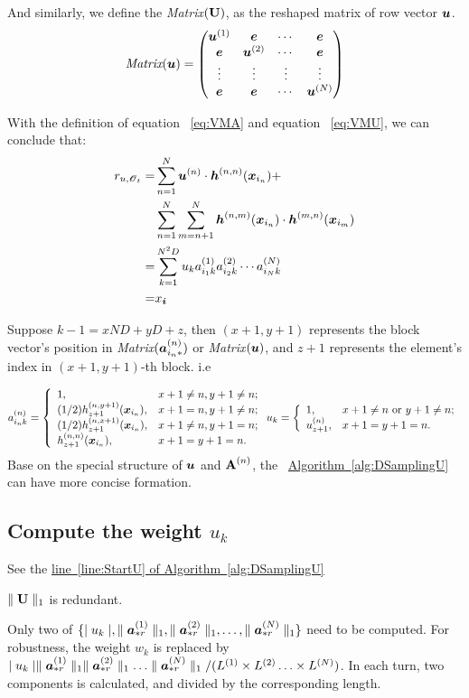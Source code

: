 \documentclass{article}
\newcommand{\Sca}[3]{{#1}^{(#2)}_{i_#2#3}}%
\newcommand{\T}[1]{\boldsymbol{\mathscr{\MakeUppercase{#1}}}}%
\newcommand{\V}[1]{{\bm{{\MakeLowercase{#1}}}}}%
\newcommand{\Varow}[1]{\V{a}^{(#1)}_{i_#1*}}
\newcommand{\Vacol}[1]{\V{a}^{(#1)}_{*r}}
\newcommand{\Vh}[2]{\V{h}^{(#1,#2)}{(\V{x}_{i_#1}})}
\newcommand{\M}[1]{{\bm{\mathbf{\MakeUppercase{#1}}}}}%
\newcommand{\norm}[2]{\parallel#1\parallel_{#2}}
\newcommand{\Alg}[1]{\hyperref[alg:#1]{Algorithm~\ref*{alg:#1}}}
\newcommand{\AlgLine}[2]{\hyperref[alg:#1]{line~\ref*{line:#2} of Algorithm~\ref*{alg:#1}}}
\begin{document}
And similarly, we define the \emph{Matrix}$(\M{U})$, as the reshaped matrix of row vector $\V{U}$.
\begin{equation}
\label{eq:VMU}
\emph{Matrix}(\V{U})=
\begin{pmatrix}
\V{u}^{(1)} & \V{e}       & \cdots & \V{e} \cr
\V{e}       & \V{u}^{(2)} & \cdots & \V{e}\cr
\vdots      & \vdots      & \vdots & \vdots\cr
\V{e}       & \V{e}       & \cdots & \V{u}^{(N)}\cr
\end{pmatrix}
\end{equation}

With the definition of equation ~\ref{eq:VMA} and equation ~\ref{eq:VMU}, we can conclude that:
\begin{align*}
r_{u,\T{O}_t} =
&\sum_{n=1}^{N}\V{u}^{(n)}\cdot\Vh{n}{n}+\\
&\sum_{n=1}^{N}\sum_{m=n+1}^{N}\Vh{n}{m}\cdot\Vh{m}{n}\\
=&\sum_{k=1}^{N^2D}u_{k}\Sca{a}{1}{k}\Sca{a}{2}{k}\cdots\Sca{a}{N}{k}\\
=&x_{\V{i}}
\end{align*}

Suppose $k-1 = xND + yD + z$, then $(x+1,y+1)$ represents the block vector's position in \emph{Matrix}$(\Varow{n})$ or \emph{Matrix}$(\V{U})$, and $z+1$ represents the element's index in $(x+1,y+1)$-th block. i.e

\begin{equation*}
\Sca{a}{n}{k}=
\left\{
  \begin{array}{ll}
    1, & \hbox{$x+1\neq n,y+1\neq n$;} \\
    (1/2)h^{(n,y+1)}_{z+1}(\V{x}_{i_{n}}), & \hbox{$x+1 = n,y+1\neq n$;} \\
    (1/2)h^{(n,x+1)}_{z+1}(\V{x}_{i_{n}}), & \hbox{$x+1 \neq n,y+1 = n$;} \\
    h^{(n,n)}_{z+1}(\V{x}_{i_{n}}), & \hbox{$x+1 = y+1 = n$.}
  \end{array}
\right.
u_k =
\left\{
  \begin{array}{ll}
    1, & \hbox{$x+1\neq n$ or $y+1\neq n$;} \\
    u^{(n)}_{z+1}, & \hbox{$x+1 = y+1 = n$.}
  \end{array}
\right.
\end{equation*}
Base on the special structure of $\V{U}$ and $\M{A}^{(n)}$, the ~\Alg{DSamplingU} can have more concise formation.

\subsection{Compute the weight $u_k$}
See the \AlgLine{DSamplingU}{StartU}
\begin{asparaitem}
\item
$\norm{\M{U}}{1}$ is redundant.
\item
Only two of $\{\mid u_k \mid,\norm{\Vacol{1}}{1},\norm{\Vacol{2}}{1},\ldots,\norm{\Vacol{N}}{1} \}$ need to be computed. For robustness, the weight $w_k$ is replaced by $\mid u_k \mid
    \norm{\Vacol{1}}{1}\norm{\Vacol{2}}{1}\ldots\norm{\Vacol{N}}{1}/(L^{(1)}\times L^{(2)}\ldots\times L^{(N)})$. In each turn, two components is calculated, and divided by the corresponding length.
\end{asparaitem}
\end{document}
